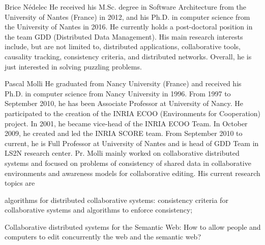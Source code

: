 
\begin{IEEEbiography}
{Brice N{\'e}delec} He received his M.Sc. degree in Software Architecture from
the University of Nantes (France) in 2012, and his Ph.D. in computer science
from the University of Nantes in 2016. He currently holds a post-doctoral
position in the team GDD (Distributed Data Management). His main research
interests include, but are not limited to, distributed applications,
collaborative tools, causality tracking, consistency criteria, and distributed
networks. Overall, he is just interested in solving puzzling problems.
\end{IEEEbiography}

\begin{IEEEbiography}
{Pascal Molli} He graduated from Nancy University (France) and received his
Ph.D. in computer science from Nancy University in 1996.  From 1997 to September
2010, he has been Associate Professor at University of Nancy. He participated to
the creation of the INRIA ECOO (Environments for Cooperation) project. In 2001,
he became vice-head of the INRIA ECOO Team. In October 2009, he created and led
the INRIA SCORE team. From September 2010 to current, he is Full Professor at
University of Nantes and is head of GDD Team in LS2N research center.  Pr. Molli
mainly worked on collaborative distributed systems and focused on problems of
consistency of shared data in collaborative environments and awareness models
for collaborative editing. His current research topics are
\begin{inparaenum}[(i)]
\item algorithms for distributed collaborative systems: consistency criteria for
collaborative systems and algorithms to enforce consistency;
\item Collaborative distributed systems for the Semantic Web: How to allow people 
and computers to edit concurrently the web and the semantic web?
\end{inparaenum}
\end{IEEEbiography}


